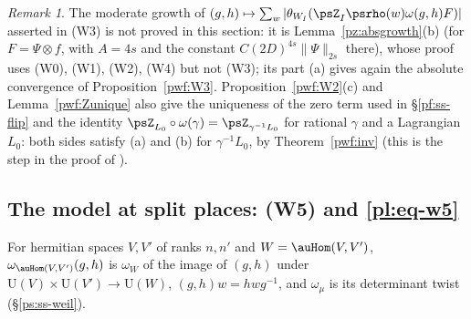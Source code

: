 \documentclass[10pt]{amsart}
\theoremstyle{definition}
\theoremstyle{remark}
\newtheorem{remark}[theorem]{Remark}
\providecommand{\auU}{\mathrm U}
\begin{document}
\begin{remark}\label{pwf:rem-W3}
The moderate growth of $(g,h)\mapsto\sum_w|\theta_{W_I}(\psZ_I\psrho(w)\omega(g,h)F)|$ asserted in
(W3) is not proved in this section: it is Lemma~\ref{pz:absgrowth}(b) (for $F=\Psi\otimes f$, with
$A=4s$ and the constant $C(2D)^{4s}\|\Psi\|_{2s}$ there), whose proof uses (W0), (W1), (W2), (W4) but
not (W3); its part (a) gives again the absolute convergence of Proposition~\ref{pwf:W3}. Proposition~\ref{pwf:W2}(c) and Lemma~\ref{pwf:Zunique} also give the uniqueness
of the zero term used in \S\ref{pf:ss-flip} and the identity $\psZ_{L_0}\circ\omega(\gamma)=
\psZ_{\gamma^{-1}L_0}$ for rational $\gamma$ and a Lagrangian $L_0$: both sides
satisfy (a) and (b) for $\gamma^{-1}L_0$, by Theorem~\ref{pwf:inv} (this is the step in the proof of
{\cite[Lemma~2.14]{P53}}).
\end{remark}

\subsection{The model at split places: (W5) and \eqref{pl:eq-w5}}\label{pwf:ss-split}

For hermitian spaces $V,V'$ of ranks $n,n'$ and $W=\auHom(V,V')$, $\omega_{\auHom(V,V')}(g,h)$ is
$\omega_W$ of the image of $(g,h)$ under $\auU(V)\times\auU(V')\to\auU(W)$, $(g,h)w=hwg^{-1}$, and
$\omega_\mu$ is its determinant twist (\S\ref{ps:ss-weil}).
\end{document}
